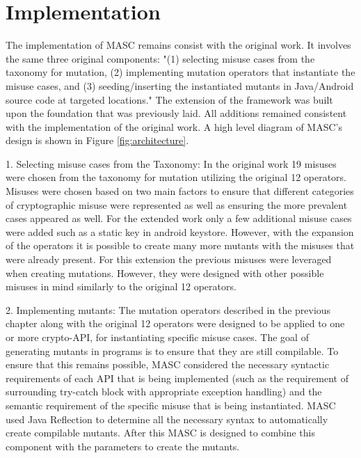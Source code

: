 \chapter{Implementation}
\label{chap_implementation}

The implementation of MASC remains consist with the original work. It involves the same three original components: "(1) selecting misuse cases from the taxonomy for mutation, (2) implementing mutation operators that instantiate the misuse cases, and (3) seeding/inserting the instantiated mutants in Java/Android source code at targeted locations." The extension of the framework was built upon the foundation that was previously laid. All additions remained consistent with the implementation of the original work. A high level diagram of MASC's design is shown in Figure \ref{fig:architecture}.

1. Selecting misuse cases from the Taxonomy: In the original work 19 misuses were chosen from the taxonomy for mutation utilizing the original 12 operators. Misuses were chosen based on two main factors to ensure that different categories of cryptographic misuse were represented as well as ensuring the more prevalent cases appeared as well. For the extended work only a few additional misuse cases were added such as a static key in android keystore. However, with the expansion of the operators it is possible to create many more mutants with the misuses that were already present. For this extension the previous misuses were leveraged when creating mutations. However, they were designed with other possible misuses in mind similarly to the original 12 operators.

2. Implementing mutants: The mutation operators described in the previous chapter along with the original 12 operators were designed to be applied to one or more crypto-API, for instantiating specific misuse cases. The goal of generating mutants in programs is to ensure that they are still compilable. To ensure that this remains possible, MASC considered the necessary syntactic requirements of each API that is being implemented (such as the requirement of surrounding try-catch block with appropriate exception handling) and the semantic requirement of the specific misuse that is being instantiated. MASC used Java Reflection to determine all the necessary syntax to automatically create compilable mutants. After this MASC is designed to combine this component with the parameters to create the mutants.


